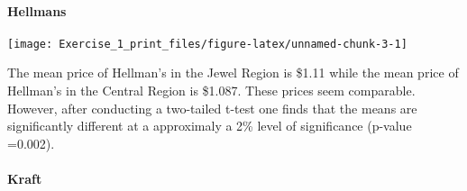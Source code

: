 \documentclass[]{article}
\newenvironment{Shaded}{\begin{snugshade}}{\end{snugshade}}
\newcommand{\DataTypeTok}[1]{\textcolor[rgb]{0.13,0.29,0.53}{#1}}
\newcommand{\KeywordTok}[1]{\textcolor[rgb]{0.13,0.29,0.53}{\textbf{#1}}}
\newcommand{\NormalTok}[1]{#1}
\newcommand{\OperatorTok}[1]{\textcolor[rgb]{0.81,0.36,0.00}{\textbf{#1}}}
\newcommand{\StringTok}[1]{\textcolor[rgb]{0.31,0.60,0.02}{#1}}
\let\oldparagraph\paragraph
\renewcommand{\paragraph}[1]{\oldparagraph{#1}\mbox{}}
\begin{document}
\hypertarget{hellmans}{%
\paragraph{Hellmans}\label{hellmans}}

\begin{Shaded}
\end{Shaded}

\begin{center}\texttt{[image: Exercise\_1\_print\_files/figure-latex/unnamed-chunk-3-1]} \end{center}

The mean price of Hellman's in the Jewel Region is \$1.11 while the mean
price of Hellman's in the Central Region is \$1.087. These prices seem
comparable. However, after conducting a two-tailed t-test one finds that
the means are significantly different at a approximaly a 2\% level of
significance (p-value =0.002).

\hypertarget{kraft}{%
\paragraph{Kraft}\label{kraft}}
\end{document}
